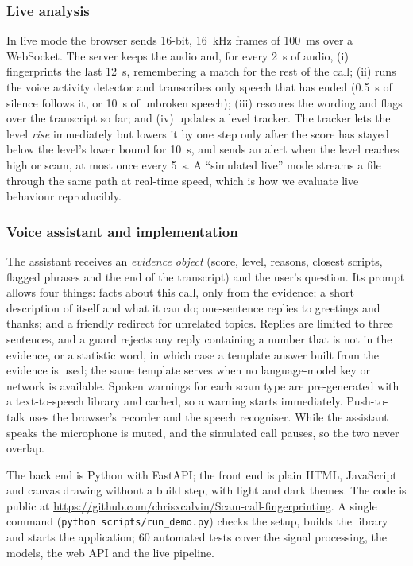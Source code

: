 \documentclass[letterpaper,12pt]{article}
\begin{document}
\subsubsection{Live analysis}
In live mode the browser sends 16-bit, 16~kHz frames of 100~ms over a WebSocket. The server keeps the audio and, for every 2~s of audio, (i) fingerprints the last 12~s, remembering a match for the rest of the call; (ii) runs the voice activity detector and transcribes only speech that has ended (0.5~s of silence follows it, or 10~s of unbroken speech); (iii) rescores the wording and flags over the transcript so far; and (iv) updates a level tracker. The tracker lets the level \emph{rise} immediately but lowers it by one step only after the score has stayed below the level's lower bound for 10~s, and sends an alert when the level reaches high or scam, at most once every 5~s. A ``simulated live'' mode streams a file through the same path at real-time speed, which is how we evaluate live behaviour reproducibly.

\subsubsection{Voice assistant and implementation}
The assistant receives an \emph{evidence object} (score, level, reasons, closest scripts, flagged phrases and the end of the transcript) and the user's question. Its prompt allows four things: facts about this call, only from the evidence; a short description of itself and what it can do; one-sentence replies to greetings and thanks; and a friendly redirect for unrelated topics. Replies are limited to three sentences, and a guard rejects any reply containing a number that is not in the evidence, or a statistic word, in which case a template answer built from the evidence is used; the same template serves when no language-model key or network is available. Spoken warnings for each scam type are pre-generated with a text-to-speech library and cached, so a warning starts immediately. Push-to-talk uses the browser's recorder and the speech recogniser. While the assistant speaks the microphone is muted, and the simulated call pauses, so the two never overlap.

The back end is Python with FastAPI; the front end is plain HTML, JavaScript and canvas drawing without a build step, with light and dark themes. The code is public at \url{https://github.com/chrisxcalvin/Scam-call-fingerprinting}. A single command (\texttt{python scripts/run\_demo.py}) checks the setup, builds the library and starts the application; 60 automated tests cover the signal processing, the models, the web API and the live pipeline.
\end{document}
